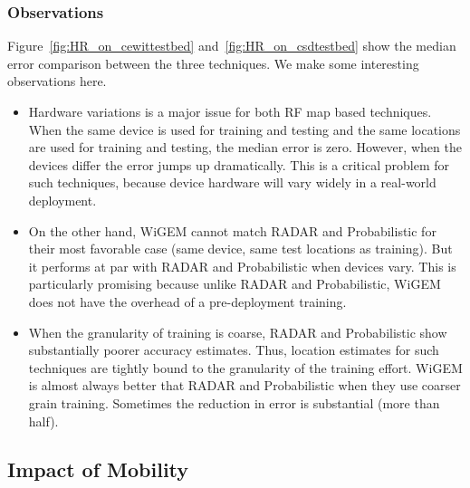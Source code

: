 \subsubsection{Observations}
\label{subsubsec:rfsignalmapobservations}

Figure~\ref{fig:HR_on_cewittestbed} and~\ref{fig:HR_on_csdtestbed} show the median error comparison between the three techniques. We make some interesting observations here.
 
\begin{itemize}

\item 
Hardware variations is a major issue for both RF map based techniques. When the same device is used for training and testing and the same locations are used for training
and testing, the median error is zero. However, when the devices differ
the error jumps up dramatically. This is a critical problem for such techniques, because device hardware will vary widely in a real-world deployment. 

\item
On the other hand, WiGEM cannot match RADAR and Probabilistic for their most 
favorable case (same device, same test locations as training). But it performs
at par with  
RADAR and Probabilistic when devices vary. This is particularly promising because unlike RADAR and Probabilistic, WiGEM does not have the overhead of a pre-deployment training.

\item 
When the granularity of training is coarse, RADAR and Probabilistic show substantially poorer accuracy estimates. Thus, location estimates for such techniques are tightly bound to the granularity of the training effort. WiGEM is almost always better that RADAR and 
Probabilistic when they use coarser grain training. Sometimes the reduction in error
is substantial (more than half). 

\end{itemize}

\subsection{Impact of Mobility}
\label{subsec:impactofmobilityongemslocalizationaccuracy}

